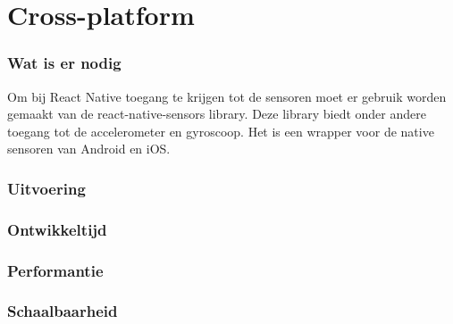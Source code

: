 


\section{Cross-platform}
\subsubsection{Wat is er nodig}
Om bij React Native toegang te krijgen tot de sensoren moet er gebruik worden gemaakt van de react-native-sensors library.
Deze library biedt onder andere toegang tot de accelerometer en gyroscoop. Het is een wrapper voor de
native sensoren van Android en iOS. 

\subsubsection{Uitvoering}



\subsubsection{Ontwikkeltijd}



\subsubsection{Performantie}



\subsubsection{Schaalbaarheid}




